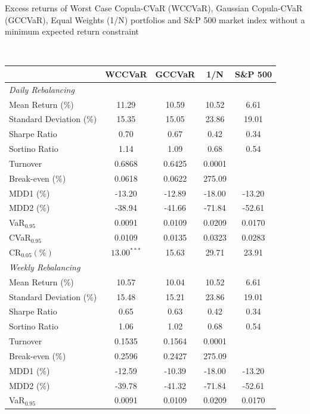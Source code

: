 \documentclass[a4paper,10pt]{article}
\begin{document}
\begin{threeparttable}[H]
	\caption{Excess returns of Worst Case Copula-CVaR (WCCVaR), Gaussian Copula-CVaR (GCCVaR), Equal Weights (1/N) portfolios and S\&P 500 market index without a minimum expected return constraint}
	\label{tab:tabletwo}\centering
	\tiny \
	\begin{tabularx}{\textwidth}{@{\extracolsep{\fill}}lcccc@{}}
		\toprule & \textbf{WCCVaR} & \textbf{GCCVaR} & \textbf{1/N} & \textbf{S\&P 500%
		} \\
		\midrule[\heavyrulewidth] \textit{Daily Rebalancing} &  &  &  &  \\
		\midrule[\heavyrulewidth] Mean Return (\%) &  11.29 & 10.59 & 10.52 & 6.61
		\\
		Standard Deviation (\%) & 15.35 &  15.05 & 23.86 & 19.01 \\
		Sharpe Ratio &  0.70 & 0.67 & 0.42 & 0.34 \\
		Sortino Ratio & 1.14 & 1.09 & 0.68 & 0.54 \\
		Turnover & 0.6868 & 0.6425 & 0.0001 &  \\
		Break-even (\%) & 0.0618 & 0.0622 & 275.09 &  \\
		MDD1 (\%) & -13.20 &  -12.89 & -18.00 & -13.20 \\
		MDD2 (\%) &  -38.94 & -41.66 & -71.84 & -52.61 \\
		VaR$_{0.95}$ &  0.0091 & 0.0109 & 0.0209  & 0.0170 \\
		CVaR$_{0.95}$ & 0.0109 & 0.0135 & 0.0323 & 0.0283 \\
		CR$_{0.05} (\%)$ &  $13.00^{***}$ & 15.63 & 29.71  & 23.91 \\
		\midrule[\heavyrulewidth] \textit{Weekly Rebalancing} &  &  &  &  \\
		\midrule[\heavyrulewidth] Mean Return (\%) & 10.57 & 10.04 & 10.52 & 6.61
		\\
		Standard Deviation (\%) & 15.48 & 15.21 & 23.86 & 19.01 \\
		Sharpe Ratio & 0.65 & 0.63 & 0.42 & 0.34 \\
		Sortino Ratio & 1.06 & 1.02 & 0.68 & 0.54 \\
		Turnover & 0.1535 & 0.1564 & 0.0001 &  \\
		Break-even (\%) &  0.2596 & 0.2427 & 275.09 &  \\
		MDD1 (\%) & -12.59 & -10.39 & -18.00 & -13.20 \\
		MDD2 (\%) & -39.78 & -41.32 & -71.84 & -52.61 \\
		VaR$_{0.95}$ &  0.0091 & 0.0109 & 0.0209  & 0.0170 \\

\end{tabularx}
\end{threeparttable}
\end{document}
